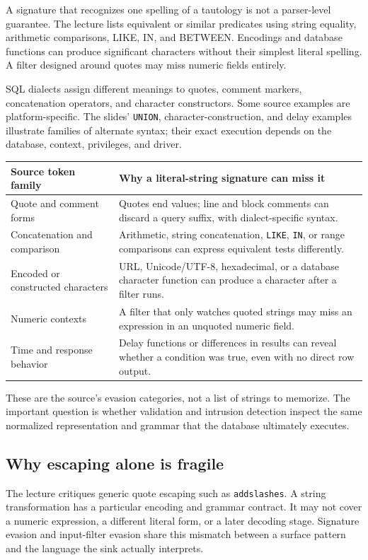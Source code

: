 \documentclass[11pt,a4paper]{article}
\numberwithin{figure}{section}
\begin{document}
A signature that recognizes one spelling of a tautology is not a parser-level guarantee. The lecture lists equivalent or similar predicates using string equality, arithmetic comparisons, LIKE, IN, and BETWEEN. Encodings and database functions can produce significant characters without their simplest literal spelling. A filter designed around quotes may miss numeric fields entirely.

SQL dialects assign different meanings to quotes, comment markers, concatenation operators, and character constructors. Some source examples are platform-specific. The slides' \texttt{UNION}, character-construction, and delay examples illustrate families of alternate syntax; their exact execution depends on the database, context, privileges, and driver.

\begin{center}\small
\begin{tabularx}{\linewidth}{@{}p{38mm}Y@{}}\toprule
Source token family & Why a literal-string signature can miss it\\\midrule
Quote and comment forms & Quotes end values; line and block comments can discard a query suffix, with dialect-specific syntax.\\
Concatenation and comparison & Arithmetic, string concatenation, \texttt{LIKE}, \texttt{IN}, or range comparisons can express equivalent tests differently.\\
Encoded or constructed characters & URL, Unicode/UTF-8, hexadecimal, or a database character function can produce a character after a filter runs.\\
Numeric contexts & A filter that only watches quoted strings may miss an expression in an unquoted numeric field.\\
Time and response behavior & Delay functions or differences in results can reveal whether a condition was true, even with no direct row output.\\\bottomrule
\end{tabularx}\end{center}
These are the source's evasion categories, not a list of strings to memorize. The important question is whether validation and intrusion detection inspect the same normalized representation and grammar that the database ultimately executes.

\subsection{Why escaping alone is fragile}
The lecture critiques generic quote escaping such as \texttt{addslashes}. A string transformation has a particular encoding and grammar contract. It may not cover a numeric expression, a different literal form, or a later decoding stage. Signature evasion and input-filter evasion share this mismatch between a surface pattern and the language the sink actually interprets.
\end{document}
